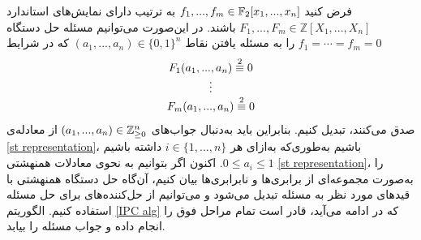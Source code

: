 فرض کنید 
$f_{1},...,f_{m}\in \mathbb{F}_{2}[x_{1},...,x_{n}]$
به ترتیب دارای نمایش‌های استاندارد 
$F_{1},...,F_{m}\in \mathbb{Z}[X_{1},...,X_{n}]$
باشند. در این‌صورت می‌توانیم مسئله‌  حل دستگاه 
$f_{1} = \cdots = f_{m} = 0$
را به مسئله‌  یافتن نقاط 
$(a_{1},...,a_{n})\in \{0, 1\}^{n}$
که در شرایط 
\begin{equation}
\label{st representation}
\begin{array}{c}
F_{1}(a_{1},...,a_{n}) \stackrel{\text{2}}{\equiv} 0\\
\vdots\\
F_{m}(a_{1},...,a_{n}) \stackrel{\text{2}}{\equiv} 0\\
\end{array}
\end{equation}
صدق می‌کنند، تبدیل کنیم. بنابراین باید به‌دنبال جواب‌های 
$(a_{1},...,a_{n})\in \mathbb{Z}_{\geq 0}^{n}$
از معادله‌ی 
\ref{st representation}،
 باشیم  به‌طوری‌که به‌ازای هر 
$i\in \{1,...,n\}$
داشته باشیم 
$0\leq a_{i}\leq 1$. 
 اکنون اگر بتوانیم به نحوی معادلات همنهشتی 
\ref{st representation}، 
را به‌صورت  مجموعه‌ای از برابری‌ها و نابرابری‌ها بیان کنیم، آن‌گاه حل دستگاه همنهشتی با قیدهای مورد نظر به مسئله‌ 
تبدیل می‌شود و می‌توانیم  از حل‌کننده‌های 
برای حل مسئله استفاده کنیم. الگوریتم 
\ref{IPC alg}
که در ادامه می‌آید، قادر است تمام مراحل فوق را انجام داده و جواب مسئله را بیابد.

